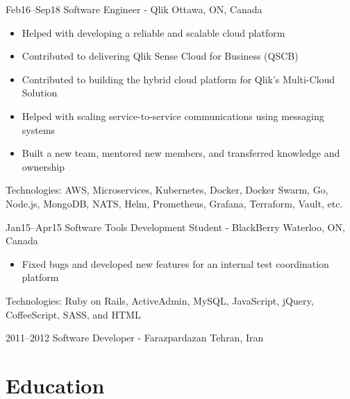\documentclass[]{cv-style}                     %
\begin{document}
\begin{entrylist}
  \entry
  {\small Feb16--Sep18}
  {Software Engineer - Qlik}
  {Ottawa, ON, Canada}
  {
    \begin{itemize}
      \item Helped with developing a reliable and scalable cloud platform
      \item Contributed to delivering Qlik Sense Cloud for Business (QSCB)
      \item Contributed to building the hybrid cloud platform for Qlik's Multi-Cloud Solution
      \item Helped with scaling service-to-service communications using messaging systems
      \item Built a new team, mentored new members, and transferred knowledge and ownership
    \end{itemize}
    Technologies: AWS, Microservices, Kubernetes, Docker, Docker Swarm, Go, Node.js, MongoDB, NATS, Helm, Prometheus, Grafana, Terraform, Vault, etc.
   }

  \entry
  {\small Jan15--Apr15}
  {Software Tools Development Student - BlackBerry}
  {Waterloo, ON, Canada}
  {
    \begin{itemize}
      \item Fixed bugs and developed new features for an internal test coordination platform
    \end{itemize}
    Technologies: Ruby on Rails, ActiveAdmin, MySQL, JavaScript, jQuery, CoffeeScript, SASS, and HTML
  }

  \entry
  {\small 2011--2012}
  {Software Developer - Farazpardazan}
  {Tehran, Iran}
  {}


\end{entrylist}



\newpage
\section{Education}
\end{document}
